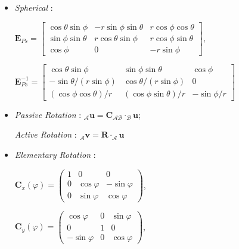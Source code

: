 \documentclass[landscape,a0paper,fontscale=0.285]{baposter} %
\begin{document}
\begin{poster}
{\begin{itemize}
    $\mathbf{E}_{Pz}^{-1} = \left[\begin{smallmatrix} \cos\theta & \sin\theta & 0 \\ -\sin\theta/\rho & \cos\theta/\rho & 0 \\ 0 & 0 & 1 \end{smallmatrix}\right]$
    \item \textit{Spherical} : 
    
    $\mathbf{E}_{Ps} = \left[\begin{smallmatrix} \cos\theta\sin\phi & -r\sin\phi\sin\theta & r\cos\phi\cos\theta \\ \sin\phi\sin\theta & r\cos\theta\sin\phi & r\cos\phi\sin\theta \\ \cos\phi & 0 & -r\sin\phi \end{smallmatrix}\right]$, 
    
    $\mathbf{E}_{Ps}^{-1} = \left[\begin{smallmatrix} \cos\theta\sin\phi & \sin\phi\sin\theta & \cos\phi \\ -\sin\theta/(r\sin\phi) & \cos\theta/(r\sin\phi) & 0 \\ (\cos\phi\cos\theta)/r & (\cos\phi\sin\theta)/r & -\sin\phi/r \end{smallmatrix}\right]$
\end{itemize}




\colorbox[HTML]{CCFFFF}{}
\begin{itemize}
    \item \textit{Passive Rotation} : $_{\mathcal{A}}\mathbf{u} = \mathbf{C}_{\mathcal{AB}} \cdot _{\mathcal{B}}\mathbf{u}$; 
    
    \textit{Active Rotation} : $_{\mathcal{A}}\mathbf{v}=\mathbf{R} \cdot _{\mathcal{A}}\mathbf{u}$
    \item \textit{Elementary Rotation} : 
    
    $\mathbf{C}_x(\varphi)=\left(\begin{smallmatrix}1 & 0 & 0 \\ 0 & \cos\varphi & -\sin\varphi \\ 0 & \sin\varphi & \cos\varphi\end{smallmatrix}\right)$, 
    
    $\mathbf{C}_y(\varphi) = \left(\begin{smallmatrix}\cos\varphi & 0 & \sin\varphi \\ 0 & 1 & 0 \\ -\sin\varphi & 0 & \cos\varphi\end{smallmatrix}\right)$, 
    

\end{itemize}}
\end{poster}
\end{document}
